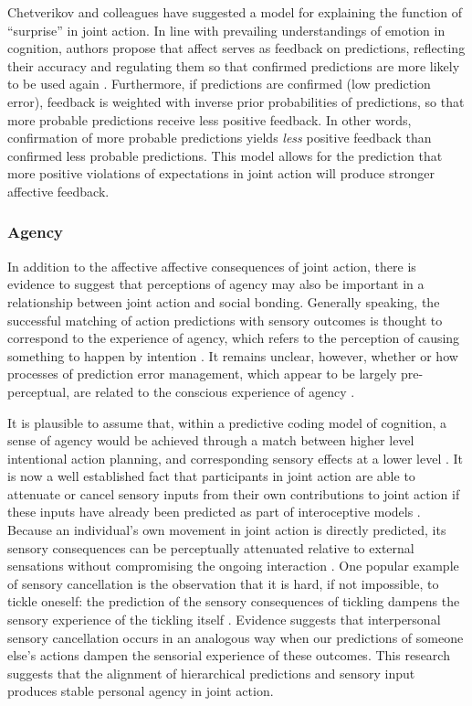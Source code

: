 \begin{CJK}{UTF8}{gbsn}
Chetverikov \textcite{Chetverikov2016} and colleagues have suggested a model for explaining the function of ``surprise'' in joint action.  In line with prevailing understandings of emotion in cognition, authors propose that affect serves as feedback on predictions, reflecting their accuracy and regulating them so that confirmed predictions are more likely to be used again \citep{Chetverikov2014}.  Furthermore, if predictions are confirmed (low prediction error), feedback is weighted with inverse prior probabilities of predictions, so that more probable predictions receive less positive feedback. In other words, confirmation of more probable predictions yields \textit{less} positive feedback than confirmed less probable predictions.  This model allows for the prediction that more positive violations of expectations in joint action will produce stronger affective feedback.

\subsubsection{Agency}
In addition to the affective affective consequences of joint action, there is evidence to suggest that perceptions of agency may also be important in a relationship between joint action and social bonding. Generally speaking, the successful matching of action predictions with sensory outcomes is thought to correspond to the experience of agency, which refers to the perception of causing something to happen by intention \citep{Frith2007,Pacherie2012,Obhi2011}.  It remains unclear, however, whether or how processes of prediction error management, which appear to be largely pre-perceptual, are related to the conscious experience of agency \citep{Pesquita2017}.

It is plausible to assume that, within a predictive coding model of cognition, a sense of agency would be achieved through a match between higher level intentional action planning, and corresponding sensory effects at a lower level \citep{VanderWel2012}.  It is now a well established fact that participants in joint action are able to attenuate or cancel sensory inputs from their own contributions to joint action if these inputs have already been predicted as part of interoceptive models \citep{Blakemore2005}.  Because an individual's own movement in joint action is directly predicted, its sensory consequences can be perceptually attenuated relative to external sensations without compromising the ongoing interaction \citep{Blakemore1999}. One popular example of sensory cancellation is the observation that it is hard, if not impossible, to tickle oneself: the prediction of the sensory consequences of tickling dampens the sensory experience of the tickling itself \citep{Frith2007}.  Evidence suggests that interpersonal sensory cancellation occurs in an analogous way when our predictions of someone else’s actions dampen the sensorial experience of these outcomes\citep{Sato2008}.  This research suggests that the alignment of hierarchical predictions and sensory input produces stable personal agency in joint action.


\end{CJK}
